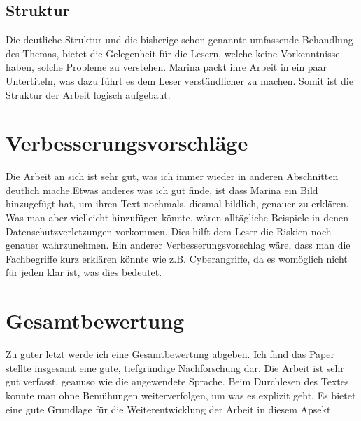 \documentclass{article}
\begin{document}
\subsection{Struktur}
Die deutliche Struktur und die bisherige schon genannte umfassende Behandlung des Themas, bietet die Gelegenheit für die Lesern, welche keine Vorkenntnisse haben, solche Probleme zu verstehen.
Marina packt ihre Arbeit in ein paar Untertiteln, was dazu führt es dem Leser verständlicher zu machen. Somit ist die Struktur der Arbeit logisch aufgebaut.

\section{Verbesserungsvorschläge}
Die Arbeit an sich ist sehr gut, was ich immer wieder in anderen Abschnitten deutlich mache.Etwas anderes was ich gut finde, ist dass Marina ein Bild hinzugefügt hat, um ihren Text nochmals, diesmal bildlich, genauer zu erklären. Was man aber vielleicht hinzufügen könnte, wären alltägliche Beispiele in denen Datenschutzverletzungen vorkommen. Dies hilft
dem Leser die Riskien noch genauer wahrzunehmen. Ein anderer Verbesserungsvorschlag wäre, dass man die Fachbegriffe kurz erklären könnte wie z.B. Cyberangriffe, da es womöglich nicht für jeden klar ist, was dies bedeutet. 
\section{Gesamtbewertung}
Zu guter letzt werde ich eine Gesamtbewertung abgeben. Ich fand das Paper stellte insgesamt eine gute, tiefgründige Nachforschung dar. Die Arbeit ist sehr gut verfasst, geanuso wie die angewendete Sprache. Beim Durchlesen 
des Textes konnte man ohne Bemühungen weiterverfolgen, um was es explizit geht. Es bietet eine gute Grundlage für die Weiterentwicklung der Arbeit in diesem Apsekt.  

\printbibliography
\end{document}
